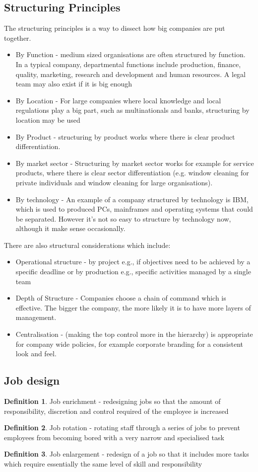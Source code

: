 \documentclass[a4paper]{article}
\theoremstyle{plain}
\theoremstyle{definition}
\newtheorem{defn}{Definition}[section]
\theoremstyle{remark}
\begin{document}
\subsection{Structuring Principles}
The structuring principles is a way to dissect how big companies are put together. 
\begin{itemize}
	\item By Function - medium sized organisations are often structured by function. In a typical company, departmental functions include production, finance, quality, marketing, research and development and human resources. A legal team may also exist if it is big enough
	\item By Location - For large companies where local knowledge and local regulations play a big part, such as multinationals and banks, structuring by location may be used
	\item By Product - structuring by product works where there is clear product differentiation.
	\item By market sector - Structuring by market sector works for example for service products, where there is clear sector differentiation (e.g. window cleaning for private individuals and window cleaning for large organisations).
	\item By technology - An example of a company structured by technology is IBM, which is used to produced PCs, mainframes and operating systems that could be separated. However it's not so easy to structure by technology now, although it make sense occasionally.
\end{itemize}
There are also structural considerations which include:
\begin{itemize}
	\item Operational structure - by project e.g., if objectives need to be achieved by a specific deadline or by production e.g., specific activities managed by a single team
		\item Depth of Structure - Companies choose a chain of command which is effective. The bigger the company, the more likely it is to have more layers of management.
		\item Centralisation - (making the top control more in the hierarchy) is appropriate for company wide policies, for example corporate branding for a consistent look and feel.
\end{itemize}
\subsection{Job design}
\begin{defn}
	Job enrichment - redesigning jobs so that the amount of responsibility, discretion and control required of the employee is increased
\end{defn}
\begin{defn}
	Job rotation - rotating staff through a series of jobs to prevent employees from becoming bored with a very narrow and specialised task
\end{defn}
\begin{defn}
	Job enlargement - redesign of a job so that it includes more tasks which require essentially the same level of skill and responsibility
\end{defn}
\end{document}
